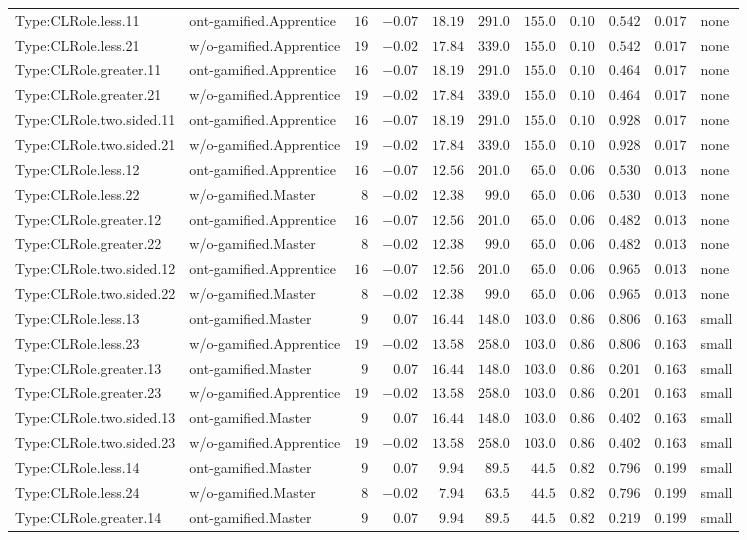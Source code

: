 \documentclass[6pt,a4paper]{article}
\begin{document}
{\begin{longtable}{llrrrrrrrrl}
Type:CLRole.less.11&ont-gamified.Apprentice&$16$&$-0.07$&$18.19$&$291.0$&$155.0$&$ 0.10$&$0.542$&$0.017$&none\tabularnewline
Type:CLRole.less.21&w/o-gamified.Apprentice&$19$&$-0.02$&$17.84$&$339.0$&$155.0$&$ 0.10$&$0.542$&$0.017$&none\tabularnewline
Type:CLRole.greater.11&ont-gamified.Apprentice&$16$&$-0.07$&$18.19$&$291.0$&$155.0$&$ 0.10$&$0.464$&$0.017$&none\tabularnewline
Type:CLRole.greater.21&w/o-gamified.Apprentice&$19$&$-0.02$&$17.84$&$339.0$&$155.0$&$ 0.10$&$0.464$&$0.017$&none\tabularnewline
Type:CLRole.two.sided.11&ont-gamified.Apprentice&$16$&$-0.07$&$18.19$&$291.0$&$155.0$&$ 0.10$&$0.928$&$0.017$&none\tabularnewline
Type:CLRole.two.sided.21&w/o-gamified.Apprentice&$19$&$-0.02$&$17.84$&$339.0$&$155.0$&$ 0.10$&$0.928$&$0.017$&none\tabularnewline
Type:CLRole.less.12&ont-gamified.Apprentice&$16$&$-0.07$&$12.56$&$201.0$&$ 65.0$&$ 0.06$&$0.530$&$0.013$&none\tabularnewline
Type:CLRole.less.22&w/o-gamified.Master&$ 8$&$-0.02$&$12.38$&$ 99.0$&$ 65.0$&$ 0.06$&$0.530$&$0.013$&none\tabularnewline
Type:CLRole.greater.12&ont-gamified.Apprentice&$16$&$-0.07$&$12.56$&$201.0$&$ 65.0$&$ 0.06$&$0.482$&$0.013$&none\tabularnewline
Type:CLRole.greater.22&w/o-gamified.Master&$ 8$&$-0.02$&$12.38$&$ 99.0$&$ 65.0$&$ 0.06$&$0.482$&$0.013$&none\tabularnewline
Type:CLRole.two.sided.12&ont-gamified.Apprentice&$16$&$-0.07$&$12.56$&$201.0$&$ 65.0$&$ 0.06$&$0.965$&$0.013$&none\tabularnewline
Type:CLRole.two.sided.22&w/o-gamified.Master&$ 8$&$-0.02$&$12.38$&$ 99.0$&$ 65.0$&$ 0.06$&$0.965$&$0.013$&none\tabularnewline
Type:CLRole.less.13&ont-gamified.Master&$ 9$&$ 0.07$&$16.44$&$148.0$&$103.0$&$ 0.86$&$0.806$&$0.163$&small\tabularnewline
Type:CLRole.less.23&w/o-gamified.Apprentice&$19$&$-0.02$&$13.58$&$258.0$&$103.0$&$ 0.86$&$0.806$&$0.163$&small\tabularnewline
Type:CLRole.greater.13&ont-gamified.Master&$ 9$&$ 0.07$&$16.44$&$148.0$&$103.0$&$ 0.86$&$0.201$&$0.163$&small\tabularnewline
Type:CLRole.greater.23&w/o-gamified.Apprentice&$19$&$-0.02$&$13.58$&$258.0$&$103.0$&$ 0.86$&$0.201$&$0.163$&small\tabularnewline
Type:CLRole.two.sided.13&ont-gamified.Master&$ 9$&$ 0.07$&$16.44$&$148.0$&$103.0$&$ 0.86$&$0.402$&$0.163$&small\tabularnewline
Type:CLRole.two.sided.23&w/o-gamified.Apprentice&$19$&$-0.02$&$13.58$&$258.0$&$103.0$&$ 0.86$&$0.402$&$0.163$&small\tabularnewline
Type:CLRole.less.14&ont-gamified.Master&$ 9$&$ 0.07$&$ 9.94$&$ 89.5$&$ 44.5$&$ 0.82$&$0.796$&$0.199$&small\tabularnewline
Type:CLRole.less.24&w/o-gamified.Master&$ 8$&$-0.02$&$ 7.94$&$ 63.5$&$ 44.5$&$ 0.82$&$0.796$&$0.199$&small\tabularnewline
Type:CLRole.greater.14&ont-gamified.Master&$ 9$&$ 0.07$&$ 9.94$&$ 89.5$&$ 44.5$&$ 0.82$&$0.219$&$0.199$&small\tabularnewline

\end{longtable}}
\end{document}
